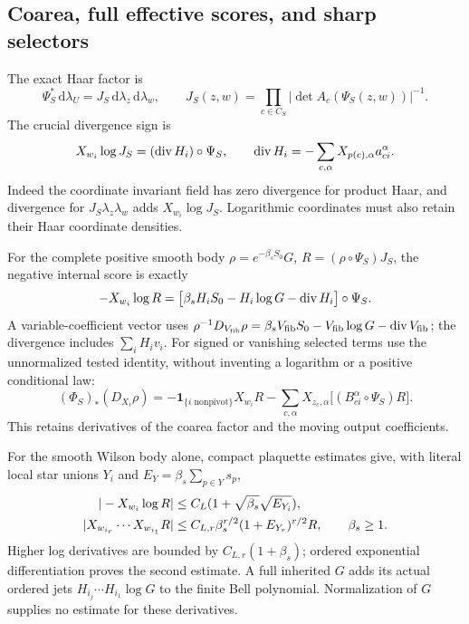 \documentclass[11pt,letterpaper]{article}
\theoremstyle{plain}
\theoremstyle{remark}\newtheorem{remark}[theorem]{Scope}
\newcommand{\dd}{\,\mathrm d}\newcommand{\OH}{\mathcal O_H}
\newcommand{\ind}{\mathbf1}
\begin{document}
\subsection{Coarea, full effective scores, and sharp selectors}

The exact Haar factor is
\begin{equation}
\Psi_S^*\dd\lambda_U=J_S\dd\lambda_z\dd\lambda_w,
\qquad J_S(z,w)=\prod_{c\in C_S}
|\det A_c(\Psi_S(z,w))|^{-1}.
\label{eq:coarea}
\end{equation}
The crucial divergence sign is
\begin{equation}
X_{w_i}\log J_S=(\operatorname{div} H_i)\circ\Psi_S,
\qquad\operatorname{div} H_i=-\sum_{c,\alpha}X_{p(c),\alpha}a_{ci}^\alpha.
\label{eq:coareascore}
\end{equation}
Indeed the coordinate invariant field has zero divergence for product Haar,
and divergence for $J_S\lambda_z\lambda_w$ adds $X_{w_i}\log J_S$.
Logarithmic coordinates must also retain their Haar coordinate densities.

For the complete positive smooth body $\rho=e^{-\beta_sS_0}G$,
$R=(\rho\circ\Psi_S)J_S$, the negative internal score is exactly
\begin{equation}
-X_{w_i}\log R
=\bigl[\beta_sH_iS_0-H_i\log G-\operatorname{div} H_i\bigr]\circ\Psi_S.
\label{eq:fullscore}
\end{equation}
A variable-coefficient vector uses
$\rho^{-1}D_{V_{\rm fib}}\rho
=\beta_sV_{\rm fib}S_0-V_{\rm fib}\log G-\operatorname{div} V_{\rm fib}$;
the divergence includes $\sum_iH_iv_i$. For signed or vanishing selected terms
use the unnormalized tested identity, without inventing a logarithm or a positive
conditional law:
\begin{equation}
(\Phi_S)_*(D_{X_i}\rho)
=-\ind_{\{i\text{ nonpivot}\}}X_{w_i}R
-\sum_{c,\alpha}X_{z_c,\alpha}\bigl[(B_{ci}^\alpha\circ\Psi_S)R\bigr].
\label{eq:pushcurrent}
\end{equation}
This retains derivatives of the coarea factor and the moving output coefficients.

For the smooth Wilson body alone, compact plaquette estimates give, with literal
local star unions $Y_i$ and $E_Y=\beta_s\sum_{p\in Y}s_p$,
\begin{align}
|-X_{w_i}\log R|&\le C_L(1+\sqrt{\beta_s}\sqrt{E_{Y_i}}),\notag\\
|X_{w_{i_r}}\cdots X_{w_{i_1}}R|
&\le C_{L,r}\beta_s^{r/2}(1+E_{Y_r})^{r/2}R,\qquad\beta_s\ge1.
\label{eq:scorejets}
\end{align}
Higher log derivatives are bounded by $C_{L,r}(1+\beta_s)$; ordered exponential
differentiation proves the second estimate. A full inherited $G$ adds its actual
ordered jets $H_{i_j}\cdots H_{i_1}\log G$ to the finite Bell polynomial.
Normalization of $G$ supplies no estimate for these derivatives.
\end{document}
